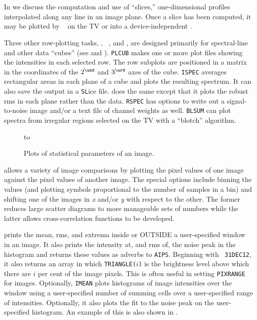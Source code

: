      In  we discuss the computation and use of ``slices,''
one-dimensional profiles interpolated along any line in an image
plane.  Once a slice has been computed, it may be plotted by {\tt
{}} on the TV or into a device-independent .

     Three other row-plotting tasks, {\tt {}}, {\tt
{}}, and {\tt{}}, are designed primarily for
spectral-line and other data ``cubes'' (see  and
).  {\tt PLCUB} makes one or more plot files showing the
intensities in each selected row.  The row subplots are positioned in
a matrix in the coordinates of the $2^{\und}$ and $3^{\urd}$ axes of
the cube.  {\tt ISPEC} averages rectangular areas in each plane of a
cube and plots the resulting spectrum.  It can also save the output in
a {\tt SL}ice file.  {\tt {}} does the same except that it
plots the robust rms in each plane rather than the data.  {\tt RSPEC}
has options to write out a signal-to-noise image and/or a text file of
channel weights as well.  {\tt BLSUM} can plot spectra from irregular
regions selected on the TV with a ``blotch'' algorithm.


\begin{figure}
\centering
\vspace{12pt}
\hbox to 
\caption[Statistical plots of an image]{Plots of statistical
   parameters of an image.}
\label{fig:miscplot}
\end{figure}

     {\tt {}} allows a variety of image comparisons by
plotting the pixel values of one image against the pixel values of
another image. The special options include binning the values (and
plotting symbols proportional to the number of samples in a bin) and
shifting one of the images in {\it x\/} and/or {\it y\/} with respect
to the other.  The former reduces large scatter diagrams to more
manageable sets of numbers while the latter allows cross-correlation
functions to be developed.

     {\tt {}} prints the mean, rms, and extrema inside or
OUTSIDE a user-specified window in an image.  It also prints the
intensity at, and rms of, the noise peak in the histogram and
returns these values as adverbs to {\tt AIPS}\@.  Beginning with {\tt
31DEC12}, it also returns an array in which {\tt TRIANGLE($i$)} is the
brightness level above which there are $i$ per cent of the image
pixels.  This is often useful in setting {\tt PIXRANGE} for
 images.  Optionally, {\tt IMEAN} plots histograms of
image intensities over the window using a user-specified number of
summing cells over a user-specified range of intensities.  Optionally,
it also plots the fit to the noise peak on the user-specified
histogram.  An example of this is also shown in .

